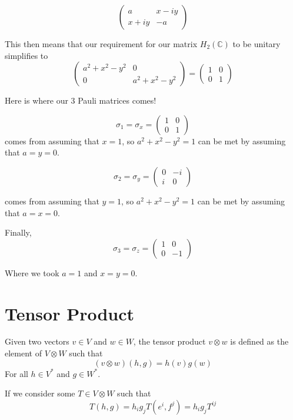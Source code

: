 $$
\begin{pmatrix}
a      & x - iy \\
x + iy & -a
\end{pmatrix}
$$

This then means that our requirement for our matrix $H_2 (\mathbb{C})$ to be unitary simplifies to
$$
\begin{pmatrix}
a^2 + x^2 - y^2 & 0                \\
0               & a^2 + x^2 - y^2
\end{pmatrix}
=
\begin{pmatrix}
1 & 0 \\
0 & 1
\end{pmatrix}
$$

Here is where our 3 Pauli matrices comes!

$$
\sigma_1 = \sigma_x =  
\begin{pmatrix}
1 & 0 \\
0 & 1
\end{pmatrix}
$$
comes from assuming that $x=1$, so $a^2 + x^2 - y^2 = 1$ can be met by assuming that $a = y = 0$.

$$
\sigma_2 = \sigma_y =  
\begin{pmatrix}
0 & -i \\
i & 0
\end{pmatrix}
$$

comes from assuming that $y=1$, so $a^2 + x^2 - y^2 = 1$ can be met by assuming that $a = x = 0$.

Finally,
$$
\sigma_3 = \sigma_z =  
\begin{pmatrix}
1 & 0 \\
0 & -1
\end{pmatrix}
$$

Where we took $a=1$ and $x = y = 0$.




\section{Tensor Product}

Given two vectors $v \in V$ and $w \in W$,
the tensor product $v \otimes w$ is defined as the element of $V \otimes W$ such that
$$
(v \otimes w)(h, g) = h(v) g(w)
$$
For all $h \in V^*$ and $g \in W^*$.

If we consider some $T \in V \otimes W$ such that
$$
T(h, g) = h_i g_j T(e^i, f^j) = h_i g_j T^{i j}
$$


